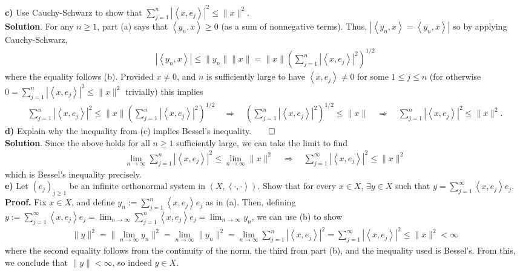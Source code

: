 \documentclass[10pt]{article}
\newcommand{\1}[1]{\mathbbm{1}_{#1}} \newcommand{\mc}[1]{\mathcal{#1}}
\newcommand{\ip}[2]{\left\langle#1,#2\right\rangle }
\begin{document}
    {\bf c)} Use Cauchy-Schwarz to show that $\sum_{j=1}^n|\ip{x}{e_j}|^2\leq \|x\|^2$.\\[5pt]
    {\bf Solution}. For any $n\geq 1$, part (a) says that $\ip{y_n}{x}\geq 0$ (as a sum of nonnegative terms). Thus, $|\ip{y_n}{x}=\ip{y_n}{x}|$ so by applying Cauchy-Schwarz,
    \begin{align*}
        |\ip{y_n}{x}|\leq \|y_n\|\|x\|=\|x\|\left(\sum_{j=1}^n|\ip{x}{e_j}|^2\right)^{1/2}
    \end{align*} 
    where the equality follows (b). Provided $x\neq 0$, and $n$ is sufficiently large to have $\ip{x}{e_j}\neq 0$ for some $1\leq j\leq n$ (for otherwise $0=\sum_{j=1}^n|\ip{x}{e_j}|^2\leq\|x\|^2$ trivially) this implies
    \begin{align*}
        \sum_{j=1}^n|\ip{x}{e_j}|^2\leq \|x\|\left(\sum_{j=1}^n|\ip{x}{e_j}|^2\right)^{1/2}\quad\Rightarrow\quad \left(\sum_{j=1}^n|\ip{x}{e_j}|^2\right)^{1/2}\leq \|x\|\quad\Rightarrow\quad \sum_{j=1}^n|\ip{x}{e_j}|^2\leq \|x\|^2.\tag*{$\qed$}
    \end{align*}
    {\bf d)} Explain why the inequality from (c) implies Bessel's inequality.\hfill{$\qed$}\\[5pt]
    {\bf Solution}. Since the above holds for all $n\geq1$ sufficiently large, we can take the limit to find
    \begin{align*}
        \lim_{n\rightarrow\infty}\sum_{j=1}^n|\ip{x}{e_j}|^2\leq\lim_{n\rightarrow\infty}\|x\|^2\quad\Rightarrow\quad\sum_{j=1}^\infty|\ip{x}{e_j}|^2\leq\|x\|^2
    \end{align*}
    which is Bessel's inequality precisely.\\[5pt]
    {\bf e)} Let $(e_j)_{j\geq 1}$ be an infinite orthonormal system in $(X,\ip{\cdot}{\cdot})$. Show that for every $x\in X$, $\exists y\in X$ such that $y=\sum_{j=1}^\infty\ip{x}{e_j}e_j$.\\[5pt]
    {\bf Proof.} Fix $x\in X$, and define $y_n:=\sum_{j=1}^n\ip{x}{e_j}e_j$ as in (a). Then, defining $y:=\sum_{j=1}^\infty\ip{x}{e_j}e_j=\lim_{n\rightarrow\infty}\sum_{j=1}^n\ip{x}{e_j}e_j=\lim_{n\rightarrow\infty}y_n$, we can use
    (b) to show
    \begin{align*}
        \|y\|^2=\|\lim_{n\rightarrow\infty}y_n\|^2=\lim_{n\rightarrow\infty}\|y_n\|^2=\lim_{n\rightarrow\infty}\sum_{j=1}^n|\ip{x}{e_j}|^2=\sum_{j=1}^\infty|\ip{x}{e_j}|^2\leq \|x\|^2<\infty
    \end{align*}
    where the second equality follows from the continuity of the norm, the third from part (b), and the inequality used is Bessel's. From this, we conclude that $\|y\|<\infty$, so indeed $y\in X$.\\[5pt]
\end{document}
